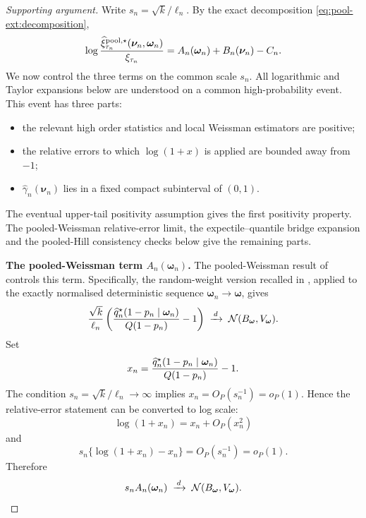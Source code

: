 \begin{proof}[Supporting argument]
Write \(s_n=\sqrt{k}/\ell_n\). By the exact decomposition
\eqref{eq:pool-ext:decomposition},
\[
  \log
  \frac{
    \widehat\xi_{\tau_n}^{\mathrm{pool},\star}(\bm\nu_n,\bm\omega_n)
  }{\xi_{\tau_n}}
  =
  A_n(\bm\omega_n)+B_n(\bm\nu_n)-C_n .
\]
We now control the three terms on the common scale \(s_n\).
All logarithmic and Taylor expansions below are understood on a common
high-probability event. This event has three parts:
\begin{itemize}
\item the relevant high order statistics and local Weissman estimators are
      positive;
\item the relative errors to which \(\log(1+x)\) is applied are bounded away
      from \(-1\);
\item \(\hat\gamma_n(\bm\nu_n)\) lies in a fixed compact subinterval of
      \((0,1)\).
\end{itemize}
The eventual upper-tail positivity assumption gives the first positivity
property. The pooled-Weissman relative-error limit, the expectile--quantile
bridge expansion and the pooled-Hill consistency checks below give the
remaining parts.

\smallskip
\noindent\textbf{The pooled-Weissman term \(A_n(\bm\omega_n)\).}
The pooled-Weissman result of
\textcite[Corollary~8]{DaouiaPadoanStupfler2021} controls this term.
Specifically, the random-weight version recalled in
, applied to the exactly normalised
deterministic sequence \(\bm\omega_n\to\bm\omega\), gives
\[
  \frac{\sqrt{k}}{\ell_n}
  \left(
    \frac{\widehat{q}^{\star}_n(1-p_n\mid\bm\omega_n)}{Q(1-p_n)}-1
  \right)
  \;\xrightarrow{\,d\,}\;
  \mathcal N(B_{\bm\omega},V_{\bm\omega}).
\]
Set
\[
  x_n
  =
  \frac{\widehat{q}^{\star}_n(1-p_n\mid\bm\omega_n)}{Q(1-p_n)}-1.
\]
The condition \(s_n=\sqrt{k}/\ell_n\to\infty\) implies
\(x_n=O_P(s_n^{-1})=o_P(1)\). Hence the relative-error statement can be
converted to log scale:
\[
  \log(1+x_n)=x_n+O_P(x_n^2)
\]
and
\[
  s_n\{\log(1+x_n)-x_n\}
  =
  O_P(s_n^{-1})
  =
  o_P(1).
\]
Therefore
\begin{equation}
\label{eq:pool-ext:A-limit}
  s_n A_n(\bm\omega_n)
  \;\xrightarrow{\,d\,}\;
  \mathcal N(B_{\bm\omega},V_{\bm\omega}).
\end{equation}


\end{proof}
